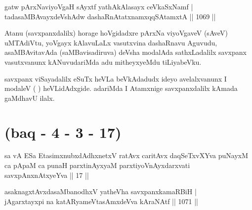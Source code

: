 \begin{shl}
gatw pArxNaviyoVgaH sAyxtf \footnotemark[5]yathAkAlasayx ceVkaSxNamf | \\
tadasaMBAvayxdeVshAdw dashaRnAtatxnamxqqSAtamxtA \hfill||  1069 ||  
\end{shl}

\begin{artha}
Atanu (savxpanxdalilx) horage hoVgidadxre pArxNa viyoVgaveV (sAveV) uMTAdiVtu, yoVgayx kAlavuLaLx vasutxvina dashaRnavu Aguvudu, asaMBAvitavAda (saMBavisadiruva) deVsha modalAda sathxLadalilx savxpanx vasutxvanunx kANuvudariMda adu mitheyxyeMdu tiLiyabeVku.
\end{artha}

\begin{artha}
savxpanx viSayadalilx eSuTx heVLa beVkAdadudx ideyo avelalxvanunx I modaleV ( ) heVLidAdxgide. adariMda I Atamxnige savxpanxdalilx kAmada gaMdhavU ilalx.
\end{artha}

\section*{(baq - 4 - 3 - 17)}
 
 \begin{shl}
sa vA ESa EtasimxnubxdAdhxnetxV ratAvx caritAvx daqSeTxvXYva puNayxM ca pApaM ca punaH parxtinAyxyaM parxtiyoVnAyxdarxvati savxpAnxnAtxyeYva || 17 ||
\end{shl}
 

\begin{shl}
asaknagxtAvxdasaMbanodhxV yatheVha savxpanxkamaRBiH | \\
jAgarxtayxpi na katAR\s yameVtasAmxdeVva kAraNAtf \hfill||  1071 ||  
\end{shl}

